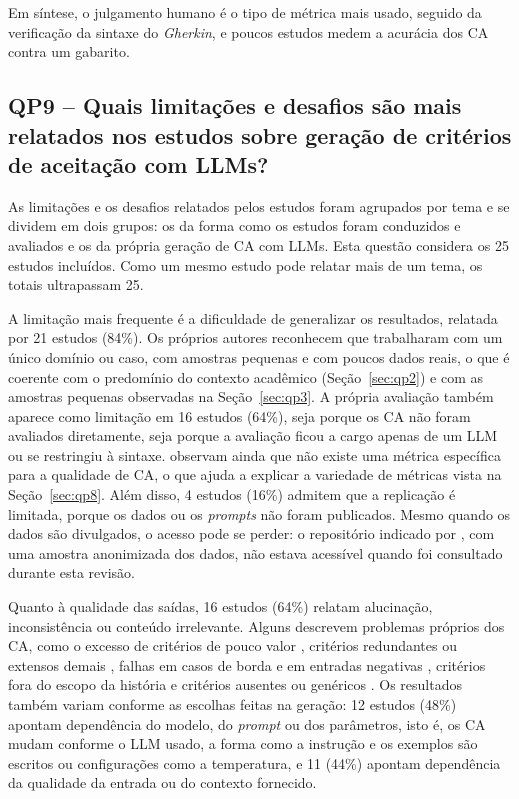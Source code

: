 Em síntese, o julgamento humano é o tipo de métrica mais usado, seguido da verificação da sintaxe do \textit{Gherkin}, e poucos estudos medem a acurácia dos CA contra um gabarito.

\subsection{QP9 -- Quais limitações e desafios são mais relatados nos estudos sobre geração de critérios de aceitação com LLMs?}
\label{sec:qp9}

As limitações e os desafios relatados pelos estudos foram agrupados por tema e se dividem em dois grupos: os da forma como os estudos foram conduzidos e avaliados e os da própria geração de CA com LLMs. Esta questão considera os 25 estudos incluídos. Como um mesmo estudo pode relatar mais de um tema, os totais ultrapassam 25.

A limitação mais frequente é a dificuldade de generalizar os resultados, relatada por 21 estudos (84\%). Os próprios autores reconhecem que trabalharam com um único domínio ou caso, com amostras pequenas e com poucos dados reais, o que é coerente com o predomínio do contexto acadêmico (Seção~\ref{sec:qp2}) e com as amostras pequenas observadas na Seção~\ref{sec:qp3}. A própria avaliação também aparece como limitação em 16 estudos (64\%), seja porque os CA não foram avaliados diretamente, seja porque a avaliação ficou a cargo apenas de um LLM ou se restringiu à sintaxe.  observam ainda que não existe uma métrica específica para a qualidade de CA, o que ajuda a explicar a variedade de métricas vista na Seção~\ref{sec:qp8}. Além disso, 4 estudos (16\%) admitem que a replicação é limitada, porque os dados ou os \textit{prompts} não foram publicados. Mesmo quando os dados são divulgados, o acesso pode se perder: o repositório indicado por , com uma amostra anonimizada dos dados, não estava acessível quando foi consultado durante esta revisão.

Quanto à qualidade das saídas, 16 estudos (64\%) relatam alucinação, inconsistência ou conteúdo irrelevante. Alguns descrevem problemas próprios dos CA, como o excesso de critérios de pouco valor \cite{rotar2025}, critérios redundantes ou extensos demais \cite{wang2025,li2024}, falhas em casos de borda e em entradas negativas \cite{wang2025,zyberaj2026}, critérios fora do escopo da história \cite{spijkman2025} e critérios ausentes ou genéricos \cite{brockenbrough2024}. Os resultados também variam conforme as escolhas feitas na geração: 12 estudos (48\%) apontam dependência do modelo, do \textit{prompt} ou dos parâmetros, isto é, os CA mudam conforme o LLM usado, a forma como a instrução e os exemplos são escritos ou configurações como a temperatura, e 11 (44\%) apontam dependência da qualidade da entrada ou do contexto fornecido.

